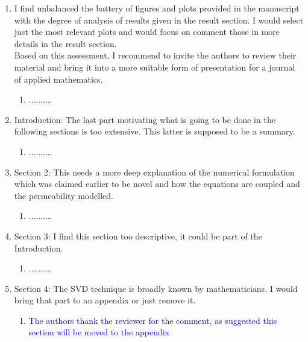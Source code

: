 \documentclass[11pt]{letter} %
\newcommand{\blue}{\textcolor{blue}}
\begin{document}
\begin{letter}
{\begin{enumerate}
\begin{enumerate}
   \begin{enumerate}
      \item \label{R_R2_TooDesc_1} \blue{..........}
        \end{enumerate}
      \item \label{R_R2_TooMuchFig} I find unbalanced the battery of figures and plots provided in the manuscript with the degree of analysis of results given in the result section. I would select just the most relevant plots and would focus on comment those in more details in the result section.\\
        Based on this assessment, I recommend to invite the authors to review their material and bring it into a more suitable form of presentation for a journal of applied mathematics.
         \begin{enumerate}
      \item \label{R_R2_TooMuchFig_1} \blue{..........}
        \end{enumerate}
\item \label{R_R2_TooMuchSum} Introduction: The last part motivating what is going to be done in the following sections is too extensive. This latter is supposed to be a summary.
   \begin{enumerate}
      \item \label{R_R2_TooMuchSum_1} \blue{..........}
        \end{enumerate}
\item \label{R_R2_NumFormulation} Section 2: This needs a more deep explanation of the numerical formulation which was claimed earlier to be novel and how the equations are coupled and the permeability modelled.
   \begin{enumerate}
      \item \label{R_R2_NumFormulation_1} \blue{..........}
        \end{enumerate}
\item \label{R_R2_TooDesc} Section 3: I find this section too descriptive, it could be part of the Introduction.
 \begin{enumerate}
      \item \label{R_R2_TooDesc_1} \blue{..........}
    \end{enumerate}
\item \label{R_R2_SVDWellKnown} Section 4: The SVD technique is broadly known by mathematicians. I would bring that part to an appendix or just remove it.
  \begin{enumerate}
      \item \label{R_R2_SVDWellKnown_1} \blue{The authors thank the reviewer for the comment, as suggested this section will be moved to the appendix}

\end{enumerate}
\end{enumerate}
\end{enumerate}}
\end{letter}
\end{document}
